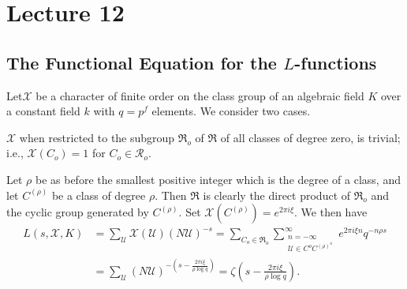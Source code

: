 \chapter{Lecture 12}\label{chap12}%

\setcounter{section}{24}
\section{The Functional Equation for the \texorpdfstring{$L$}{L}-functions}\label{chap12:sec25}%

Let\pageoriginale $\mathcal{X}$ be a character of finite order on the class group of
an algebraic field $K$ over a constant field $k$ with $q=p^f$
elements. We consider two cases.

\setcounter{Case}{0}
\begin{Case}%
  $\mathcal{X}$ when restricted to the subgroup $\mathfrak{R}_o$ of
  $\mathfrak{R}$ of all classes of degree zero, is trivial; i.e.,
  $\mathcal{X} (C_o)=1$ for $C_o \in \mathscr{R}_o$.   
\end{Case}

Let $\rho$ be as before the smallest positive integer which is the
degree of a class, and let $C ^{(\rho)}$ be a class of degree
$\rho$. Then $\mathfrak{R}$ is clearly the direct product of
$\mathfrak{R}_o$ and the cyclic group generated by $C ^{(\rho)}$. Set
$\mathcal{X} (C^{(\rho)}) = e^{2 \pi i \xi}$. We then have 
\begin{align*}
   L (s, \mathcal{X}, K) & = \sum_\mathscr{U} \mathcal{X} (\mathscr{U})
  (N \mathscr{U})^{-s} = \sum_{ C_o \in \mathfrak{R}_o}
  \sum\limits_{\substack{n = - \infty\\ \mathscr{U} \in C^o
      C^{(\rho)^n}}}^\infty e^{2 \pi i \xi n} q^{-n \rho s}\\ 
  &=  \sum_\mathscr{U} (N \mathscr{U})^{- \left(s -\frac{2 \pi i \xi}{\rho
    \log q}\right)} = \zeta \left(s- \frac{2 \pi i \xi}{\rho \log q}\right). 
\end{align*}

